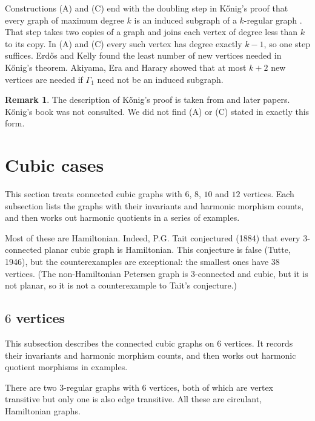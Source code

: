 \documentclass[12pt,letterpaper]{article}
\theoremstyle{definition}
\newtheorem{revremark}{Remark}
\begin{document}
Constructions (A) and (C) end with the doubling step in K\H{o}nig's proof
that every graph of maximum degree $k$ is an induced subgraph of a
$k$-regular graph \cite{Ko36}. That step takes two copies of a graph and
joins each vertex of degree less than $k$ to its copy. In (A) and (C) every
such vertex has degree exactly $k-1$, so one step suffices. Erd\H{o}s and
Kelly \cite{EK63} found the least number of new vertices needed in
K\H{o}nig's theorem. Akiyama, Era and Harary \cite{AEH83} showed that at
most $k+2$ new vertices are needed if $\Gamma_1$ need not be an induced
subgraph.

\begin{revremark}
\label{rem:constructions}
The description of K\H{o}nig's proof is taken from \cite{EK63} and later
papers. K\H{o}nig's book was not consulted. We did not find (A) or (C)
stated in exactly this form.
\end{revremark}


\section{Cubic cases}
\label{sec:cubic-examples}

This section treats connected cubic graphs with $6$, $8$, $10$ and $12$
vertices. Each subsection lists the graphs with their invariants and
harmonic morphism counts, and then works out harmonic quotients in a
series of examples.


Most of these are Hamiltonian.
Indeed, P.G. Tait conjectured (1884) that every $3$-connected planar
cubic graph is Hamiltonian. This conjecture is false (Tutte, 1946), but the
counterexamples are exceptional: the smallest ones have $38$ vertices.
(The non-Hamiltonian Petersen graph is $3$-connected and cubic, but it is not
planar, so it is not a counterexample to Tait's conjecture.)

\subsection{\texorpdfstring{$6$}{6} vertices}
\label{sec:cubic-6-vertices}

This subsection describes the connected cubic graphs on $6$ vertices.
It records their invariants and harmonic morphism counts, and then
works out harmonic quotient morphisms in examples.


There are two $3$-regular graphs with $6$ vertices, both of which are
vertex transitive but only one is also edge transitive.
All these are circulant, Hamiltonian graphs.
\end{document}
